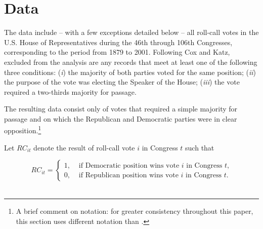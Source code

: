 \section{Data}
\label{ckdata}

The data include -- with a few exceptions detailed below -- all roll-call votes in the 
U.S. House of Representatives during the 46th through 106th Congresses, corresponding 
to the period from 1879 to 2001.  Following Cox and Katz, excluded from the analysis are 
any records that meet at least one of the following three conditions: ({\it i}) the majority of 
both parties voted for the same position; ({\it ii}) the purpose of the vote was electing the 
Speaker of the House; ({\it iii}) the vote required a two-thirds majority for passage.

The resulting data consist only of votes that required a simple majority for passage and on 
which the Republican and Democratic parties were in clear opposition.\footnote{A brief 
comment on notation: for greater consistency throughout this paper, this section uses different 
notation than .}

Let $RC_{it}$ denote the result of roll-call vote $i$ in Congress $t$ such that 

\begin{equation*}
RC_{it} =
\begin{cases} 
1, & \text{ if Democratic position wins vote $i$ in Congress $t$,} \\[10pt]
0, & \text{ if Republican position wins vote $i$ in Congress $t$.}
\end{cases}
\end{equation*}
~\\[-12pt]


